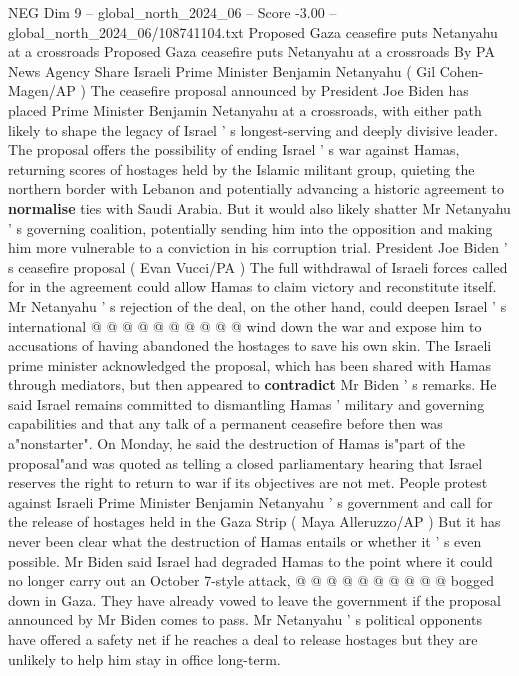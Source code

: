 \begin{textsample}{NEG Dim 9 – global\_north\_2024\_06 – Score -3.00 – global\_north\_2024\_06/108741104.txt}  \label{ex:f9_neg_166}
Proposed Gaza ceasefire puts Netanyahu at a crossroads Proposed Gaza ceasefire puts Netanyahu at a crossroads By PA News Agency Share Israeli Prime Minister Benjamin Netanyahu ( Gil Cohen-Magen/AP ) The ceasefire proposal announced by President Joe Biden has placed Prime Minister Benjamin Netanyahu at a crossroads, with either path likely to shape the legacy of Israel ' s longest-serving and deeply divisive leader.
The proposal offers the possibility of ending Israel ' s war against Hamas, returning scores of hostages held by the Islamic militant group, quieting the northern border with Lebanon and potentially advancing a historic agreement to \textbf{normalise} ties with Saudi Arabia.
But it would also likely shatter Mr Netanyahu ' s governing coalition, potentially sending him into the opposition and making him more vulnerable to a conviction in his corruption trial.
President Joe Biden ' s ceasefire proposal ( Evan Vucci/PA ) The full withdrawal of Israeli forces called for in the agreement could allow Hamas to claim victory and reconstitute itself.
Mr Netanyahu ' s rejection of the deal, on the other hand, could deepen Israel ' s international @ @ @ @ @ @ @ @ @ @ wind down the war and expose him to accusations of having abandoned the hostages to save his own skin.
The Israeli prime minister acknowledged the proposal, which has been shared with Hamas through mediators, but then appeared to \textbf{contradict} Mr Biden ' s remarks.
He said Israel remains committed to dismantling Hamas ' military and governing capabilities and that any talk of a permanent ceasefire before then was a"nonstarter".
On Monday, he said the destruction of Hamas is"part of the proposal"and was quoted as telling a closed parliamentary hearing that Israel reserves the right to return to war if its objectives are not met.
People protest against Israeli Prime Minister Benjamin Netanyahu ' s government and call for the release of hostages held in the Gaza Strip ( Maya Alleruzzo/AP ) But it has never been clear what the destruction of Hamas entails or whether it ' s even possible.
Mr Biden said Israel had degraded Hamas to the point where it could no longer carry out an October 7-style attack, @ @ @ @ @ @ @ @ @ @ bogged down in Gaza.
They have already vowed to leave the government if the proposal announced by Mr Biden comes to pass.
Mr Netanyahu ' s political opponents have offered a safety net if he reaches a deal to release hostages but they are unlikely to help him stay in office long-term.

\end{textsample}
